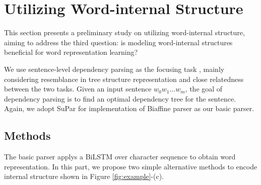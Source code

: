 
\section{Utilizing Word-internal Structure}

This section presents a preliminary study on utilizing word-internal structure, aiming to address the third question: is modeling word-internal structures beneficial for word representation learning? 

We use sentence-level dependency parsing as the focusing task \cite{KublerDEP09}, mainly considering resemblance in tree structure representation and close relatedness between the two tasks. 
Given an input sentence $w_0w_1...w_m$, 
the goal of dependency parsing is to find an optimal dependency tree for the sentence. 
Again, we adopt SuPar \cite{zhang-etal-2020-dep} for implementation of Biaffine parser \cite{dozat2016deep} %
as our basic parser. 


\subsection{Methods}

The basic parser applys a BiLSTM over character sequence to obtain word representation. 
In this part, we propose two  simple alternative methods to encode internal structure shown in Figure \ref{fig:example}-(c).

